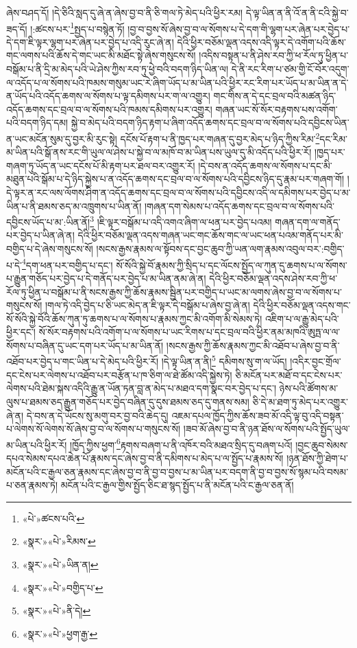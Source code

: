 ཞེས་བཤད་དོ། །དེ་ཅིའི་སླད་དུ་ཞེ་ན་ཞེས་བྱ་བ་ནི་ཅི་གལ་ཏེ་མེད་པའི་ཕྱིར་རམ། དེ་ལྟ་ཡིན་ན་ནི་འོ་ན་ནི་ངའི་སྐྱེ་བ་ཟད་དོ། །:ཚངས་པར་\footnote{«པེ་»ཚངས་པའི་}སྤྱད་པ་བསྙེན་ཏོ། །བྱ་བ་བྱས་སོ་ཞེས་བྱ་བ་ལ་སོགས་པ་དེ་དག་གི་ལྷག་པར་ཞེན་པར་བྱེད་པ་དེ་དག་ཇི་ལྟར་ལྷག་པར་ཞེན་པར་བྱེད་པ་འདི་རུང་ཞེ་ན། དེའི་ཕྱིར་བཅོམ་ལྡན་འདས་འདི་ལྟར་དེ་འགོག་པའི་ཆོས་གང་ལགས་པའི་ཆོས་དེ་གང་ཡང་མི་མཐོང་སྟེ་ཞེས་གསུངས་སོ། །འདིས་བསྟན་པ་ནི་ཤེས་རབ་ཀྱི་ཕ་རོལ་ཏུ་ཕྱིན་པ་བསྒོམ་པ་ནི་དྲི་མ་མེད་པའི་ཡེ་ཤེས་ཀྱིས་རབ་ཏུ་ཕྱེ་བའི་བདག་ཉིད་ཡིན་ལ། དེ་ནི་རང་རིག་པ་ཙམ་གྱི་ངོ་བོར་འདུག་ལ་འདོད་པ་ལ་སོགས་པའི་ཁམས་གསུམ་ཡང་རེ་ཞིག་ཡོད་པ་མ་ཡིན་པའི་ཕྱིར་རང་རིག་པར་ཡོད་པ་མ་ཡིན་ན་དེ་ན་ཡོད་པའི་འདོད་ཆགས་ལ་སོགས་པ་ལྟ་དམིགས་པར་ག་ལ་འགྱུར། གང་གིས་ན་དེ་དང་བྲལ་བའི་མཚན་ཉིད་འདོད་ཆགས་དང་བྲལ་བ་ལ་སོགས་པའི་ཁམས་དམིགས་པར་འགྱུར། གཞན་ཡང་སོ་སོར་བརྟགས་པས་འགོག་པའི་བདག་ཉིད་དམ། སྐྱེ་བ་མེད་པའི་བདག་ཉིད་རྟག་པ་ཞིག་འདོད་ཆགས་དང་བྲལ་བ་ལ་སོགས་པའི་དབྱིངས་ཡིན་ན་ཡང་མངོན་སུམ་དུ་བྱར་མི་རུང་སྟེ། དངོས་པོ་རྟག་པ་ནི་ཁྱད་པར་གཞན་དུ་བྱར་མེད་པ་ཉིད་ཀྱིས་རིམ་\footnote{«སྣར་»«པེ་»རིམས་}དང་རིམ་མ་ཡིན་པའི་སྒོ་ནས་རང་གི་ཡུལ་ལ་ཤེས་པ་སྐྱེ་བ་ལ་མཁོ་བ་མ་ཡིན་པས་ཡུལ་དུ་མི་འདོད་པའི་ཕྱིར་རོ། །ཁྱད་པར་གཞག་ཏུ་ཡོད་ན་ཡང་དངོས་པོ་མི་རྟག་པར་ཐལ་བར་འགྱུར་རོ། །དེ་བས་ན་འདོད་ཆགས་ལ་སོགས་པ་དང་མི་མཐུན་པའི་སྒོམ་པ་དེ་ཉིད་སྐྱེས་པ་ན་འདོད་ཆགས་དང་བྲལ་བ་ལ་སོགས་པའི་དབྱིངས་ཉིད་དུ་རྣམ་པར་གཞག་གོ། །དེ་ལྟར་ན་རང་ལས་ལོགས་ཤིག་ན་འདོད་ཆགས་དང་བྲལ་བ་ལ་སོགས་པའི་དབྱིངས་འདི་ལ་དམིགས་པར་བྱེད་པ་མ་ཡིན་པ་ནི་ཐམས་ཅད་མ་འཁྲུགས་པ་ཡིན་ནོ། །གཞན་དག་སེམས་པ་འདོད་ཆགས་དང་བྲལ་བ་ལ་སོགས་པའི་དབྱིངས་ཡོད་པ་མ་:ཡིན་ནོ།\footnote{«སྣར་»«པེ་»ཡིན་ན།} །ཇི་ལྟར་བསྒོམ་པ་འདི་འགའ་ཞིག་ལ་ཕན་པར་བྱེད་པའམ། གཞན་དག་ལ་གནོད་པར་བྱེད་པ་ཡིན་ཞེ་ན། དེའི་ཕྱིར་བཅོམ་ལྡན་འདས་གཞན་ཡང་གང་ཆོས་གང་ལ་ཡང་ཕན་པའམ་གནོད་པར་མི་བགྱིད་པ་དེ་ཞེས་གསུངས་སོ། །སངས་རྒྱས་རྣམས་ལ་སྟོབས་དང་བྱང་ཆུབ་ཀྱི་ཡན་ལག་རྣམས་འབུལ་བར་:བགྱིད་པ་དེ་\footnote{«སྣར་»«པེ་»བགྱིད་པ་}དག་ཕན་པར་བགྱིད་པ་དང་། སོ་སོའི་སྐྱེ་བོ་རྣམས་ཀྱི་སྲིད་པ་དང་ལོངས་སྤྱོད་ལ་ཀུན་དུ་ཆགས་པ་ལ་སོགས་པ་རྒྱུན་གཅོད་པར་བྱེད་པ་དེ་གནོད་པར་བྱེད་པ་མ་ཡིན་ནམ་ཞེ་ན། དེའི་ཕྱིར་བཅོམ་ལྡན་འདས་ཤེས་རབ་ཀྱི་ཕ་རོལ་ཏུ་ཕྱིན་པ་བསྒོམ་པ་ནི་སངས་རྒྱས་ཀྱི་ཆོས་རྣམས་སྦྱིན་པར་བགྱིད་པ་ཡང་མ་ལགས་ཞེས་བྱ་བ་ལ་སོགས་པ་གསུངས་སོ། །གལ་ཏེ་འདི་བྱེད་པ་ཅི་ཡང་མེད་ན་ཇི་ལྟར་དེ་བསྒོམ་པ་ཞེས་བྱ་ཞེ་ན། དེའི་ཕྱིར་བཅོམ་ལྡན་འདས་གང་སོ་སོའི་སྐྱེ་བོའི་ཆོས་ཀུན་ཏུ་ཆགས་པ་ལ་སོགས་པ་རྣམས་ཀྱང་མི་འགོག་མི་སེམས་ཏེ། འཇིག་པ་ལ་རྒྱུ་མེད་པའི་ཕྱིར་དང་། སོ་སོར་བརྟགས་པའི་འགོག་པ་ལ་སོགས་པ་ཡང་རིགས་པ་དང་བྲལ་བའི་ཕྱིར་ནམ་མཁའི་ཨུཏྤ་ལ་ལ་སོགས་པ་བཞིན་དུ་ཡང་དག་པར་ཡོད་པ་མ་ཡིན་ནོ། །སངས་རྒྱས་ཀྱི་ཆོས་རྣམས་ཀྱང་མི་འཐོབ་པ་ཞེས་བྱ་བ་ནི་འཐོབ་པར་བྱེད་པ་གང་ཡིན་པ་དེ་མེད་པའི་ཕྱིར་རོ། །དེ་ལྟ་ཡིན་ན་ནི།\footnote{«སྣར་»«པེ་»ནི་དེ།} དམིགས་སུ་ག་ལ་ཡོད། །འདིར་བྱང་གྲོལ་དང་ངེས་པར་ལེགས་པ་འཐོབ་པར་བརྩོན་པ་ཁ་ཅིག་ལ་ཐེ་ཚོམ་འདི་སྐྱེས་ཏེ། ཅི་མངོན་པར་མཐོ་བ་དང་ངེས་པར་ལེགས་པའི་ཐེམ་སྐས་འདིའི་རྒྱུ་ན་ཡོན་ཏན་བླ་ན་མེད་པ་མཐའ་དག་སྣང་བར་བྱེད་པ་དང་། ཉེས་པའི་ཚོགས་མ་ལུས་པ་ཐམས་ཅད་རྒྱུན་གཅོད་པར་བྱེད་བཞིན་དུ་དུས་ཐམས་ཅད་དུ་གནས་སམ། ཅི་དེ་མ་ཐག་ཏུ་མེད་པར་འགྱུར་ཞེ་ན། དེ་བས་ན་དེ་ཡོངས་སུ་མགུ་བར་བྱ་བའི་ཆེད་དུ། འཇམ་དཔལ་ཁྱོད་ཀྱིས་ཆོས་ཟབ་མོ་འདི་ལྟ་བུ་འདི་བསྟན་པ་ལེགས་སོ་ལེགས་སོ་ཞེས་བྱ་བ་ལ་སོགས་པ་གསུངས་སོ། །ཟབ་མོ་ཞེས་བྱ་བ་ནི་ཉན་ཐོས་ལ་སོགས་པའི་སྤྱོད་ཡུལ་མ་ཡིན་པའི་ཕྱིར་རོ། །ཁྱོད་ཀྱིས་ཕྱག་\footnote{«སྣར་»«པེ་»ཕྱག་རྒྱ་}རྟགས་བཞག་པ་ནི་འཁོར་བའི་མཐའ་སྲིད་དུ་བཞག་པའོ། །བྱང་ཆུབ་སེམས་དཔའ་སེམས་དཔའ་ཆེན་པོ་རྣམས་དང་ཞེས་བྱ་བ་ནི་དམིགས་པ་མེད་པ་ལ་སྤྱོད་པ་རྣམས་སོ། །ཉན་ཐོས་ཀྱི་ཐེག་པ་མངོན་པའི་ང་རྒྱལ་ཅན་རྣམས་དང་ཞེས་བྱ་བ་ནི་བྱ་བ་བྱས་པ་མ་ཡིན་པར་བདག་ནི་བྱ་བ་བྱས་སོ་སྙམ་པའི་བསམ་པ་ཅན་རྣམས་ཏེ། མངོན་པའི་ང་རྒྱལ་གྱིས་སྤྱོད་ཅིང་ཐ་སྙད་སྤྱོད་པ་ནི་མངོན་པའི་ང་རྒྱལ་ཅན་ནོ། 